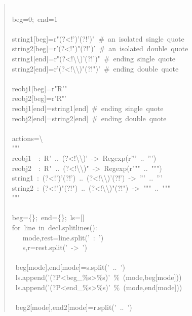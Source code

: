 \documentclass[10pt,english]{article}
\begin{document}
\begin{quote}
\begin{ttfamily}
\begin{flushleft}
\mbox{}\\
\mbox{beg=0;~end=1}\\
\mbox{}\\
\mbox{string1[beg]=r"(?<!')'(?!')"~{\#}~an~isolated~single~quote}\\
\mbox{string2[beg]=r'(?<!")"(?!")'~{\#}~an~isolated~double~quote}\\
\mbox{string1[end]=r"(?<!{\textbackslash}{\textbackslash})'(?!')"~{\#}~ending~single~quote}\\
\mbox{string2[end]=r'(?<!{\textbackslash}{\textbackslash})"(?!")'~{\#}~ending~double~quote}\\
\mbox{}\\
\mbox{reobj1[beg]=r"R'"~~~~~~~}\\
\mbox{reobj2[beg]=r'R"'~}\\
\mbox{reobj1[end]=string1[end]~{\#}~ending~single~quote}\\
\mbox{reobj2[end]=string2[end]~{\#}~ending~double~quote}\\
\mbox{}\\
\mbox{actions={\textbackslash}}\\
\mbox{"""}\\
\mbox{reobj1~~:~R'~..~(?<!{\textbackslash}{\textbackslash})'~->~Regexp(r'''~..~''')}\\
\mbox{reobj2~~:~R"~..~(?<!{\textbackslash}{\textbackslash})"~->~Regexp(r"""~..~""")}\\
\mbox{string1~:~(?<!')'(?!')~..~(?<!{\textbackslash}{\textbackslash})'(?!')~->~'''~..~'''}\\
\mbox{string2~:~(?<!")"(?!")~..~(?<!{\textbackslash}{\textbackslash})"(?!")~->~"""~..~"""}\\
\mbox{"""}\\
\mbox{}\\
\mbox{beg={\{}{\}};~end={\{}{\}};~ls=[]}\\
\mbox{for~line~in~decl.splitlines():}\\
\mbox{~~~mode,rest=line.split('~:~')}\\
\mbox{~~~s,r=rest.split('~->~')}\\
\mbox{}\\
\mbox{~beg[mode],end[mode]=s.split('~..~')}\\
\mbox{~ls.append('(?P<beg{\_}{\%}s>{\%}s)'~{\%}~(mode,beg[mode]))}\\
\mbox{~ls.append('(?P<end{\_}{\%}s>{\%}s)'~{\%}~(mode,end[mode]))}\\
\mbox{}\\
\mbox{~beg2[mode],end2[mode]=r.split('~..~')}\\

\end{flushleft}
\end{ttfamily}
\end{quote}
\end{document}
